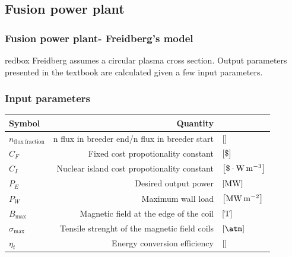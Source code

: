 \documentclass[hyperref={colorlinks=true,urlcolor=blue,linkcolor=.},aspectratio=1610,mathserif]{beamer}
\begin{document}
\subsection{Fusion power plant}
\begin{frame}
	\frametitle{Fusion power plant- Freidberg's model}
                \centering
			  \begin{beamercolorbox}[sep=1em,wd=8cm]{redbox}
              Freidberg assumes a circular plasma cross section. Output parameters presented in the textbook are calculated given a few input parameters.
              \end{beamercolorbox}
\end{frame}
\begin{frame}
	\frametitle{Input parameters}
		\begin{table}
	\begin{tabular}{lrl}
		\toprule
		Symbol                         & Quantity                                                                               &  \\
		\midrule
		\(n_\mathrm{flux \ fraction}\) & n flux in breeder end/n flux in breeder start& \(\bqty{}\)                                \\
		\(C_F\)                        & Fixed cost propotionality constant &\(\bqty{\$}\)                                         \\
		\(C_I\)                        & Nuclear island cost propotionality constant & \(\bqty{\$\cdot\si{\watt\per\meter\cubed}}\) \\
		\(P_E\)                        & Desired output power& \(\bqty{\si{\mega\watt}}\)                                          \\
		\(P_W\)                        & Maximum wall load &\(\bqty{\si{\mega\watt\per\meter\squared}}\)                           \\
		\(B_{\max}\)                   & Magnetic field at the edge of the coil &\(\bqty{\si{\tesla}}\)                            \\
		\(\sigma_{\max}\)              & Tensile strenght of the magnetic field coils& \(\bqty{\si{\atm}}\)                        \\
		\(\eta_t\)                     & Energy conversion efficiency& \(\bqty{}\)                                                 \\
		\bottomrule
	\end{tabular}
\end{table}
\end{frame}
\end{document}
